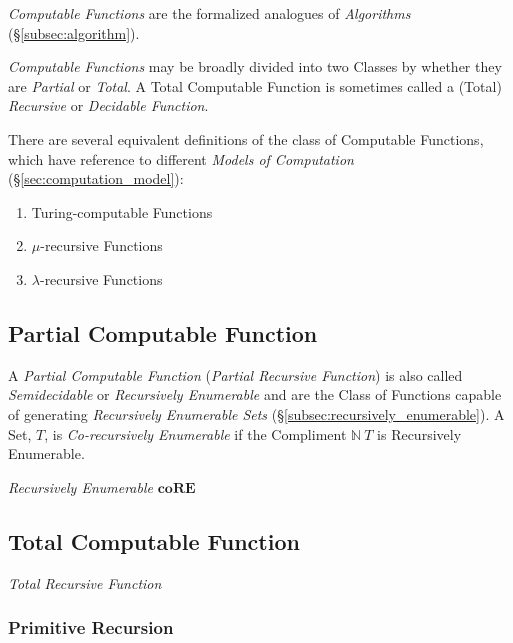 \documentclass{article}
\begin{document}
\emph{Computable Functions} are the formalized analogues of \emph{Algorithms}
(\S\ref{subsec:algorithm}).

\emph{Computable Functions} may be broadly divided into two Classes by
whether they are \emph{Partial} or \emph{Total}. A Total Computable
Function is sometimes called a (Total) \emph{Recursive} or
\emph{Decidable Function}.

There are several equivalent definitions of the class of Computable
Functions, which have reference to different \emph{Models of
  Computation} (\S\ref{sec:computation_model}):
\begin{enumerate}
\item Turing-computable Functions
\item $\mu$-recursive Functions
\item $\lambda$-recursive Functions
\end{enumerate}

\subsection{Partial Computable Function}\label{subsec:partial_recursive}

A \emph{Partial Computable Function} (\emph{Partial Recursive
  Function}) is also called \emph{Semidecidable} or \emph{Recursively
  Enumerable} and are the Class of Functions capable of generating
\emph{Recursively Enumerable Sets}
(\S\ref{subsec:recursively_enumerable}). A Set, $T$, is
\emph{Co-recursively Enumerable} if the Compliment $\mathbb{N} \ T$ is
Recursively Enumerable.

\emph{Recursively Enumerable} $\mathbf{coRE}$

\subsection{Total Computable Function}\label{subsec:recursive_function}

\emph{Total Recursive Function}

\subsubsection{Primitive Recursion}\label{subsec:primitive_recursion}
\end{document}
